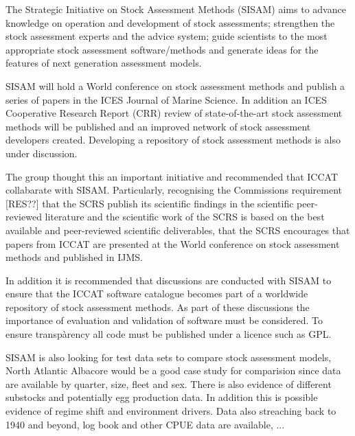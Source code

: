 \documentclass[a4paper,10pt]{article}
\title{}
\author{}
\date{}
\begin{document}
\maketitle

The Strategic Initiative on Stock Assessment Methods (SISAM) aims to advance knowledge on operation and development of stock assessments;
strengthen the stock assessment experts and the advice system; guide scientists to the most appropriate stock assessment software/methods
and generate ideas for the features of next generation assessment models.

SISAM will hold a World conference on stock assessment methods and publish a series of papers in the ICES Journal of Marine Science.
In addition an ICES Cooperative Research Report (CRR) review of state-of-the-art stock assessment methods will be published and an improved 
network of stock assessment developers created. Developing a repository of stock assessment methods is also under discussion.

The group thought this an important initiative and recommended that ICCAT collabarate with SISAM. Particularly, recognising the 
Commissions requirement [RES??] that the SCRS publish its scientific findings in the scientific peer-reviewed literature and the 
scientific work of the SCRS is based on the best available and peer-reviewed scientific deliverables, that the SCRS encourages that papers 
from ICCAT are presented at the World conference on stock assessment methods and published in IJMS.

In addition it is recommended that discussions are conducted with SISAM to ensure that the ICCAT software catalogue becomes part of a
worldwide repository of stock assessment methods. As part of these discussions the importance of evaluation and validation of software
must be considered. To ensure transpàrency all code must be published under a licence such as GPL. 

SISAM is also looking for test data sets to compare stock assessment models, North Atlantic Albacore would be a good case study for 
comparision since data are available by quarter, size, fleet and sex. There is also evidence of different substocks and potentially 
egg production data. In addition this is possible evidence of regime shift and environment drivers. Data also streaching back to 1940
and beyond, log book and other CPUE data are available,	 ...
\end{document}
